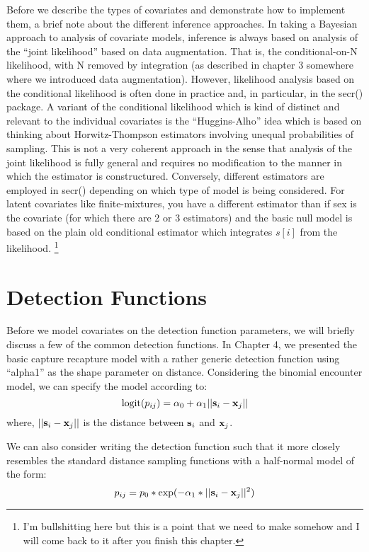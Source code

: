 Before we  describe the types of covariates and demonstrate how to implement them, a brief note about the different inference approaches. In taking a Bayesian approach to analysis of covariate models, inference is always based on analysis of the ``joint likelihood'' based on data augmentation. That is, the conditional-on-N likelihood, with N removed by integration (as described in chapter 3 somewhere where we introduced data augmentation). However, likelihood analysis based on the conditional likelihood is often done in practice and, in particular, in the secr() package.  A variant of the conditional likelihood which is kind of distinct and relevant to the individual covariates is the ``Huggins-Alho'' idea which is based on thinking about Horwitz-Thompson estimators involving unequal probabilities of sampling.  This is not a very coherent approach in the sense that analysis of the joint likelihood is fully general and requires no modification to the manner in which the estimator is constructured. Conversely, different estimators are employed in secr() depending on which type of model is being considered. For latent covariates like finite-mixtures, you have a different estimator than if sex is the covariate (for which there are 2 or 3 estimators) and the basic null model is based on the plain old conditional estimator which integrates $s[i]$ from the likelihood. \footnote{ I'm bullshitting here but this is a point that we need to make somehow and I will come back to it after you finish this chapter.}


\section{Detection Functions}

Before we model covariates on the detection function parameters, we will briefly discuss a few of the common detection functions.  In Chapter 4, we presented the basic capture recapture model with a rather generic detection function using ``alpha1'' as the shape parameter on distance.   Considering the binomial encounter model, we can specify the model according to:
\begin{equation}
	\mbox{logit}(p_{ij}) = \alpha_{0} + \alpha_1 ||{\bf s}_{i}-{\bf x}_{j} ||
\label{scr0.eq.logit}
\end{equation}
where, $||{\bf s}_{i}-{\bf x}_{j}||$ is the distance between ${\bf s}_{i}$ and ${\bf x}_{j}$. 

We can also consider writing the detection function such that it more closely resembles the standard distance sampling functions with a half-normal model of the form:
\[
p_{ij} = p_{0}*\exp(-\alpha_{1} *||{\bf s}_{i}-{\bf x}_{j}||^2)
\]

